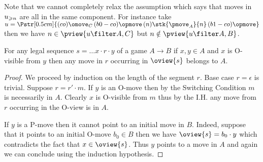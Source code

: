 Note that we cannot completely relax the assumption 
which says that moves in $u_{\geqslant n}$ are all in the same component.
For instance take $u = \Pstr[0.5cm]{(co){\omove_C}\thinspace 
(b0-co){\opmove} \thinspace 
(n){\stk{\pmove_A}{n}} \thinspace 
(b1-co){\opmove}}$ then we have $n\in\pview{u\filter A,C}$ but $n\notin\pview{u\filter A,B}$.




\begin{lemma}
\label{lem:oviewsegmentinB}
For any legal sequence $s = \ldots x \cdot r \cdot y$ of a game $A\rightarrow B$ if $x, y \in A$ and $x$ is O-visible from $y$ then any move in $r$ occurring in $\oview{s}$ belongs to $A$.
\end{lemma}
\begin{proof}
We proceed by induction on the length of the segment $r$.
Base case $r=\epsilon$ is trivial. Suppose $r = r' \cdot m$.
If $y$ is an O-move then by the Switching Condition
$m$ is necessarily in $A$. Clearly $x$ is O-visible from $m$ thus  by the I.H. any move from $r$ occurring in the O-view is in $A$.

If $y$ is a P-move then it cannot point to an initial move in $B$. Indeed, suppose that it points to an initial O-move $b_0 \in B$ then
we have $\oview{s} = b_0 \cdot y$ which contradicts the fact that $x\in \oview{s}$.
Thus $y$ points to a move in $A$ and again we can conclude using the induction hypothesis.
\end{proof}


